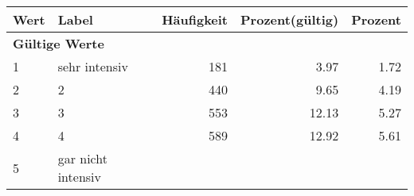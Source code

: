      \begin{longtable}{lXrrr}
     \toprule
     \textbf{Wert} & \textbf{Label} & \textbf{Häufigkeit} & \textbf{Prozent(gültig)} & \textbf{Prozent} \\
     \endhead
     \midrule
     \multicolumn{5}{l}{\textbf{Gültige Werte}}\\

     1 &
     \multicolumn{1}{X}{ sehr intensiv   } &


       \num{181} &
       \num[round-mode=places,round-precision=2]{3,97} &
         \num[round-mode=places,round-precision=2]{1,72} \\

     2 &
     \multicolumn{1}{X}{ 2   } &


       \num{440} &
       \num[round-mode=places,round-precision=2]{9,65} &
         \num[round-mode=places,round-precision=2]{4,19} \\

     3 &
     \multicolumn{1}{X}{ 3   } &


       \num{553} &
       \num[round-mode=places,round-precision=2]{12,13} &
         \num[round-mode=places,round-precision=2]{5,27} \\

     4 &
     \multicolumn{1}{X}{ 4   } &


       \num{589} &
       \num[round-mode=places,round-precision=2]{12,92} &
         \num[round-mode=places,round-precision=2]{5,61} \\

     5 &
     \multicolumn{1}{X}{ gar nicht intensiv   } &



\end{longtable}
